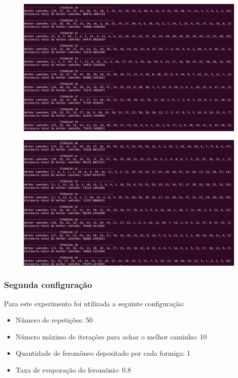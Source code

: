 \documentclass[hidelinks,12pt]{article}
\begin{document}
		\newpage

		\begin{figure}[!h]
			\centering
			\includegraphics[scale=0.4]{Figures/m29-1-4.png}
		\end{figure}

		\newpage

		\begin{figure}[!h]
			\centering
			\includegraphics[scale=0.4]{Figures/m29-1-5.png}
		\end{figure}
		
		\newpage
		
		\subsubsection{Segunda configuração}
		 	Para este experimento foi utilizada a seguinte configuração:

		 	\begin{itemize}
				\item Número de repetições: 50
				\item Número máximo de iterações para achar o melhor caminho: 10
				\item Quantidade de feromôneo depositado por cada formiga: 1
				\item Taxa de evaporação do feromônio: 0.8
			\end{itemize}
\end{document}
